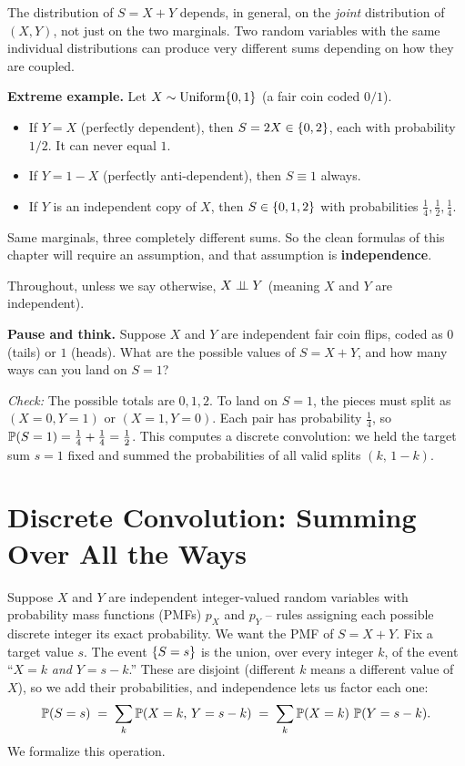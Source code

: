 \begin{focusbox}
The distribution of $S = X+Y$ depends, in general, on the \emph{joint}
distribution of $(X,Y)$, not just on the two marginals. Two random
variables with the same individual distributions can produce very
different sums depending on how they are coupled.

\textbf{Extreme example.} Let $X \sim \Unif\set{0,1}$ (a fair coin coded
$0/1$).
\begin{itemize}
  \item If $Y = X$ (perfectly dependent), then $S = 2X \in \set{0,2}$,
        each with probability $1/2$. It can never equal $1$.
  \item If $Y = 1-X$ (perfectly anti-dependent), then $S \equiv 1$ always.
  \item If $Y$ is an independent copy of $X$, then
        $S \in \set{0,1,2}$ with probabilities $\tfrac14,\tfrac12,\tfrac14$.
\end{itemize}
Same marginals, three completely different sums. So the clean formulas of
this chapter will require an assumption, and that assumption is
\textbf{independence}.
\end{focusbox}

Throughout, unless we say otherwise, $X \indep Y$ (meaning $X$ and $Y$ are independent).

\begin{recoverybox}
\textbf{Pause and think.} Suppose $X$ and $Y$ are independent fair coin flips, coded as $0$ (tails) or $1$ (heads). What are the possible values of $S = X + Y$, and how many ways can you land on $S = 1$?

\emph{Check:} The possible totals are $0, 1, 2$. To land on $S = 1$, the pieces must split as $(X=0, Y=1)$ or $(X=1, Y=0)$. Each pair has probability $\tfrac14$, so $\P(S=1) = \tfrac14 + \tfrac14 = \tfrac12$. This computes a discrete convolution: we held the target sum $s=1$ fixed and summed the probabilities of all valid splits $(k,\,1-k)$.
\end{recoverybox}

\section{Discrete Convolution: Summing Over All the Ways}
\label{ch17:discrete-conv}

Suppose $X$ and $Y$ are independent integer-valued random variables with
probability mass functions (PMFs) $p_X$ and $p_Y$ -- rules assigning each
possible discrete integer its exact probability. We want the PMF of
$S = X+Y$. Fix a target value $s$. The event $\set{S=s}$ is the union,
over every integer $k$, of the event ``$X=k$ \emph{and} $Y=s-k$.'' These
are disjoint (different $k$ means a different value of $X$), so we add
their probabilities, and independence lets us factor each one:
\[
\P(S=s) \;=\; \sum_{k} \P(X=k,\,Y=s-k)
            \;=\; \sum_{k} \P(X=k)\,\P(Y=s-k).
\]
We formalize this operation.

